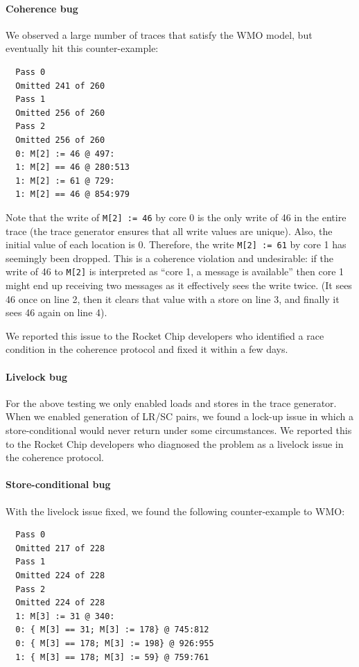 \documentclass[11pt]{article}
\begin{document}
\paragraph{Coherence bug} We observed a large number
of traces that satisfy the WMO model, but eventually hit this
counter-example:

\begin{verbatim}
  Pass 0
  Omitted 241 of 260         
  Pass 1
  Omitted 256 of 260         
  Pass 2
  Omitted 256 of 260         
  0: M[2] := 46 @ 497:
  1: M[2] == 46 @ 280:513
  1: M[2] := 61 @ 729:
  1: M[2] == 46 @ 854:979
\end{verbatim}

\noindent Note that the write of \verb!M[2] := 46! by core 0 is the
only write of 46 in the entire trace (the trace generator ensures that
all write values are unique). Also, the initial value of each location
is 0.  Therefore, the write \verb!M[2] := 61!  by core 1 has seemingly
been dropped.  
This is a coherence violation and undesirable: if the
write of 46 to \verb!M[2]!  is interpreted as ``core 1, a message is
available'' then core 1 might end up receiving two messages as it
effectively sees the write twice.
(It sees 46 once on line 2, then it
clears that value with a store on line 3, and finally it sees 46 again
on line 4).

We reported this issue to the Rocket Chip developers who identified a
race condition in the coherence protocol and fixed it within a few
days.

\paragraph{Livelock bug} For the above testing we only enabled loads
and stores in the trace generator.  When we enabled generation of
LR/SC pairs, we found a lock-up issue in which a store-conditional
would never return under some circumstances.  We reported this to the
Rocket Chip developers who diagnosed the problem as a livelock issue
in the coherence protocol.

\paragraph{Store-conditional bug}  With the livelock issue fixed,
we found the following counter-example to WMO:

\begin{verbatim}
  Pass 0
  Omitted 217 of 228         
  Pass 1
  Omitted 224 of 228         
  Pass 2
  Omitted 224 of 228         
  1: M[3] := 31 @ 340:
  0: { M[3] == 31; M[3] := 178} @ 745:812
  0: { M[3] == 178; M[3] := 198} @ 926:955
  1: { M[3] == 178; M[3] := 59} @ 759:761
\end{verbatim}
\end{document}
